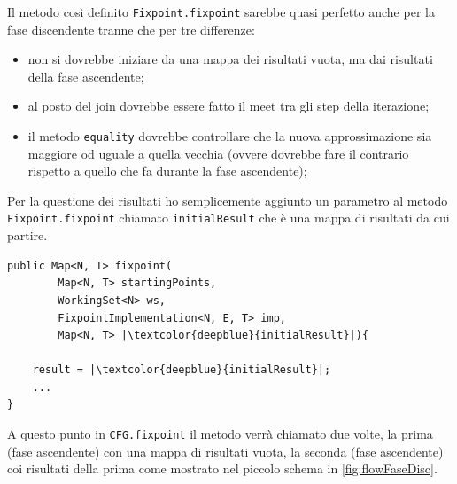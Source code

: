 Il metodo così definito \texttt{Fixpoint.fixpoint} sarebbe quasi perfetto anche per la fase discendente tranne che per tre differenze:
\begin{itemize}
\itemsep0pt
    \item non si dovrebbe iniziare da una mappa dei risultati vuota, ma dai risultati della fase ascendente;
    \item al posto del join dovrebbe essere fatto il meet tra gli step della iterazione;
    \item il metodo \texttt{equality} dovrebbe controllare che la nuova approssimazione sia maggiore od uguale a quella vecchia (ovvere dovrebbe fare il contrario rispetto a quello che fa durante la fase ascendente);
\end{itemize}
Per la questione dei risultati ho semplicemente aggiunto un parametro al metodo \texttt{Fixpoint.fixpoint} chiamato \texttt{initialResult} che è una mappa di risultati da cui partire. 
\begin{lstlisting}[belowskip=-1.1 \baselineskip, escapechar=|]
public Map<N, T> fixpoint(
        Map<N, T> startingPoints, 
        WorkingSet<N> ws,
        FixpointImplementation<N, E, T> imp, 
        Map<N, T> |\textcolor{deepblue}{initialResult}|){

    result = |\textcolor{deepblue}{initialResult}|;
    ...
}
\end{lstlisting}
A questo punto in \texttt{CFG.fixpoint} il metodo verrà chiamato due volte, la prima (fase ascendente) con una mappa di risultati vuota, la seconda (fase ascendente) coi risultati della prima come mostrato nel piccolo schema in \ref{fig:flowFaseDisc}.

